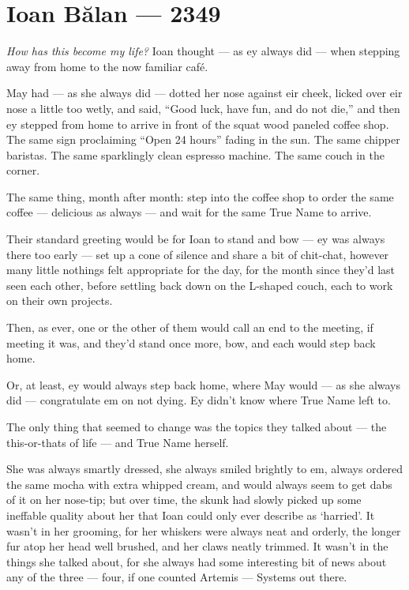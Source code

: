 \hypertarget{ioan-bux103lan-2349}{%
\chapter{Ioan Bălan — 2349}\label{ioan-bux103lan-2349}}

\emph{How has this become my life?} Ioan thought — as ey always did — when stepping away from home to the now familiar café.

May had — as she always did — dotted her nose against eir cheek, licked over eir nose a little too wetly, and said, ``Good luck, have fun, and do not die,'' and then ey stepped from home to arrive in front of the squat wood paneled coffee shop. The same sign proclaiming ``Open 24 hours'' fading in the sun. The same chipper baristas. The same sparklingly clean espresso machine. The same couch in the corner.

The same thing, month after month: step into the coffee shop to order the same coffee — delicious as always — and wait for the same True Name to arrive.

Their standard greeting would be for Ioan to stand and bow — ey was always there too early — set up a cone of silence and share a bit of chit-chat, however many little nothings felt appropriate for the day, for the month since they'd last seen each other, before settling back down on the L-shaped couch, each to work on their own projects.

Then, as ever, one or the other of them would call an end to the meeting, if meeting it was, and they'd stand once more, bow, and each would step back home.

Or, at least, ey would always step back home, where May would — as she always did — congratulate em on not dying. Ey didn't know where True Name left to.

The only thing that seemed to change was the topics they talked about — the this-or-thats of life — and True Name herself.

She was always smartly dressed, she always smiled brightly to em, always ordered the same mocha with extra whipped cream, and would always seem to get dabs of it on her nose-tip; but over time, the skunk had slowly picked up some ineffable quality about her that Ioan could only ever describe as `harried'. It wasn't in her grooming, for her whiskers were always neat and orderly, the longer fur atop her head well brushed, and her claws neatly trimmed. It wasn't in the things she talked about, for she always had some interesting bit of news about any of the three — four, if one counted Artemis — Systems out there.

